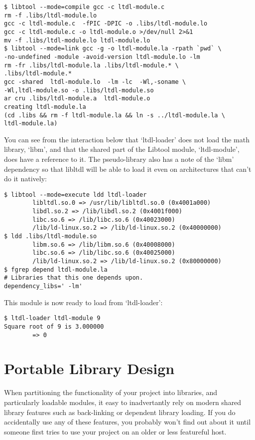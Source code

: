 \begin{Verbatim}[frame=single]
$ libtool --mode=compile gcc -c ltdl-module.c
rm -f .libs/ltdl-module.lo
gcc -c ltdl-module.c  -fPIC -DPIC -o .libs/ltdl-module.lo
gcc -c ltdl-module.c -o ltdl-module.o >/dev/null 2>&1
mv -f .libs/ltdl-module.lo ltdl-module.lo
$ libtool --mode=link gcc -g -o ltdl-module.la -rpath `pwd` \
-no-undefined -module -avoid-version ltdl-module.lo -lm
rm -fr .libs/ltdl-module.la .libs/ltdl-module.* \
.libs/ltdl-module.*
gcc -shared  ltdl-module.lo  -lm -lc  -Wl,-soname \
-Wl,ltdl-module.so -o .libs/ltdl-module.so
ar cru .libs/ltdl-module.a  ltdl-module.o
creating ltdl-module.la
(cd .libs && rm -f ltdl-module.la && ln -s ../ltdl-module.la \
ltdl-module.la)
\end{Verbatim}

You can see from the interaction below that `ltdl-loader' does not load the math library, `libm', and that the shared part of the Libtool module, `ltdl-module', does have a reference to it. The pseudo-library also has a note of the `libm' dependency so that libltdl will be able to load it even on architectures that can't do it natively:

\begin{Verbatim}[frame=single]
$ libtool --mode=execute ldd ltdl-loader
        libltdl.so.0 => /usr/lib/libltdl.so.0 (0x4001a000)
        libdl.so.2 => /lib/libdl.so.2 (0x4001f000)
        libc.so.6 => /lib/libc.so.6 (0x40023000)
        /lib/ld-linux.so.2 => /lib/ld-linux.so.2 (0x40000000)
$ ldd .libs/ltdl-module.so
        libm.so.6 => /lib/libm.so.6 (0x40008000)
        libc.so.6 => /lib/libc.so.6 (0x40025000)
        /lib/ld-linux.so.2 => /lib/ld-linux.so.2 (0x80000000)
$ fgrep depend ltdl-module.la
# Libraries that this one depends upon.
dependency_libs=' -lm'
\end{Verbatim}

This module is now ready to load from `ltdl-loader':

\begin{Verbatim}[frame=single]
$ ltdl-loader ltdl-module 9
Square root of 9 is 3.000000
        => 0
\end{Verbatim}

\section{Portable Library Design}

When partitioning the functionality of your project into libraries, and particularly loadable modules, it easy to inadvertantly rely on modern shared library features such as back-linking or dependent library loading. If you do accidentally use any of these features, you probably won't find out about it until someone first tries to use your project on an older or less featureful host.

